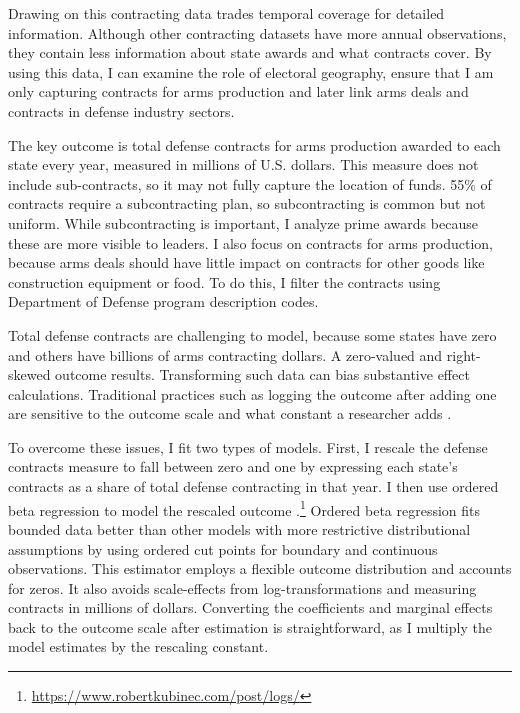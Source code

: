\documentclass[12pt]{article}
\begin{document}
Drawing on this contracting data trades temporal coverage for detailed information. 
Although other contracting datasets have more annual observations, they contain less information about state awards and what contracts cover. 
By using this data, I can examine the role of electoral geography, ensure that I am only capturing contracts for arms production and later link arms deals and contracts in defense industry sectors. 


The key outcome is total defense contracts for arms production awarded to each state every year, measured in millions of U.S. dollars.
This measure does not include sub-contracts, so it may not fully capture the location of funds. 
55\% of contracts require a subcontracting plan, so subcontracting is common but not uniform.  
While subcontracting is important, I analyze prime awards because these are more visible to leaders. 
I also focus on contracts for arms production, because arms deals should have little impact on contracts for other goods like construction equipment or food.
To do this, I filter the contracts using Department of Defense program description codes. 


Total defense contracts are challenging to model, because some states have zero and others have billions of arms contracting dollars. 
A zero-valued and right-skewed outcome results. 
Transforming such data can bias substantive effect calculations.
Traditional practices such as logging the outcome after adding one are sensitive to the outcome scale and what constant a researcher adds \citep{ChenRoth2022, MullahyNorton2022}. 


To overcome these issues, I fit two types of models.
First, I rescale the defense contracts measure to fall between zero and one by expressing each state's contracts as a share of total defense contracting in that year.
I then use ordered beta regression to model the rescaled outcome \citep{Kubinec2023}.\footnote{\url{https://www.robertkubinec.com/post/logs/}} 
Ordered beta regression fits bounded data better than other models with more restrictive distributional assumptions by using ordered cut points for boundary and continuous observations. 
This estimator employs a flexible outcome distribution and accounts for zeros.
It also avoids scale-effects from log-transformations and measuring contracts in millions of dollars. 
Converting the coefficients and marginal effects back to the outcome scale after estimation is straightforward, as I multiply the model estimates by the rescaling constant.
\end{document}
